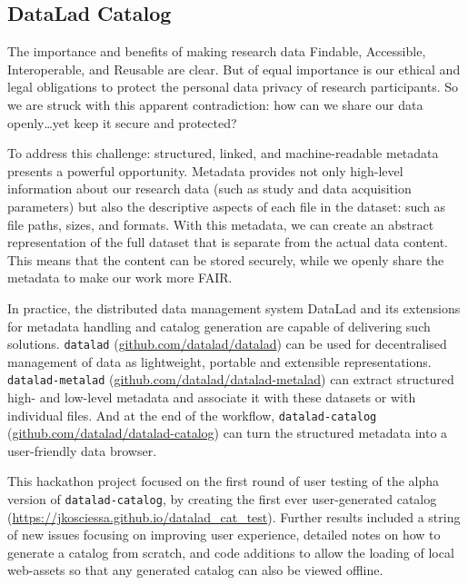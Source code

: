 \documentclass[../main.tex]{subfiles}
\begin{document}
\subsection{DataLad Catalog}\label{sec:DLC}


The importance and benefits of making research data Findable, Accessible, Interoperable, and Reusable are clear\supercite{Wilkinson2016}. But of equal importance is our ethical and legal obligations to protect the personal data privacy of research participants. So we are struck with this apparent contradiction: how can we share our data openly…yet keep it secure and protected?

To address this challenge: structured, linked, and machine-readable metadata presents a powerful opportunity. Metadata provides not only high-level information about our research data (such as study and data acquisition parameters) but also the descriptive aspects of each file in the dataset: such as file paths, sizes, and formats. With this metadata, we can create an abstract representation of the full dataset that is separate from the actual data content. This means that the content can be stored securely, while we openly share the metadata to make our work more FAIR.

In practice, the distributed data management system DataLad\supercite{Halchenko2021} and its extensions for metadata handling and catalog generation are capable of delivering such solutions. \texttt{datalad} (\url{github.com/datalad/datalad}) can be used for decentralised management of data as lightweight, portable and extensible representations. \texttt{datalad-metalad} (\url{github.com/datalad/datalad-metalad}) can extract structured high- and low-level metadata and associate it with these datasets or with individual files. And at the end of the workflow, \texttt{datalad-catalog} (\url{github.com/datalad/datalad-catalog}) can turn the structured metadata into a user-friendly data browser.

This hackathon project focused on the first round of user testing of the alpha version of \texttt{datalad-catalog}, by creating the first ever user-generated catalog (\url{https://jkosciessa.github.io/datalad_cat_test}). Further results included a string of new issues focusing on improving user experience, detailed notes on how to generate a catalog from scratch, and code additions to allow the loading of local web-assets so that any generated catalog can also be viewed offline.
\end{document}
